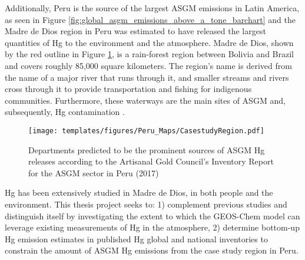 \begin{flushleft}
Additionally, Peru is the source of the largest ASGM emissions in Latin America, as seen in Figure \ref{fig:global_asgm_emissions_above_a_tone_barchart} and the Madre de Dios region in Peru was estimated to have released the largest quantities of Hg to the environment and the atmosphere\cite{agc_reporte_2017}. Madre de Dios, shown by the red outline in Figure \ref{fig:PeruCS}, is a rain-forest region between Bolivia and Brazil and covers roughly 85,000 square kilometers. The region's name is derived from the name of a major river that runs through it, and smaller streams and rivers cross through it to provide transportation and fishing for indigenous communities. Furthermore, these waterways are the main sites of ASGM and, subsequently, Hg contamination \cite{ashe_elevated_2012,agc_reporte_2017}. 
\begin{figure}[H]
  \texttt{[image: templates/figures/Peru\_Maps/CasestudyRegion.pdf]}
  \centering
  \caption{Departments predicted to be the prominent sources of ASGM Hg releases according to the Artisanal Gold Council's  Inventory Report for the ASGM sector in Peru (2017) }
  \label{fig:PeruCS}
\end{figure}
\FloatBarrier

Hg has been extensively studied in Madre de Dios, in both people and the environment. This thesis project seeks to: 1) complement previous studies and distinguish itself  by investigating the extent to which the GEOS-Chem model can leverage existing measurements of Hg in the atmosphere, 2) determine bottom-up Hg emission estimates in published Hg global and national inventories to constrain the amount of ASGM Hg emissions from the case study region in Peru. 

\end{flushleft}
